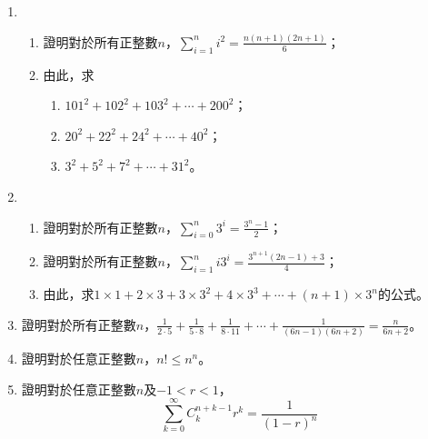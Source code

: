 \documentclass[12pt]{article}
\begin{document}
\begin{enumerate}
        \item \begin{enumerate}
            \item 證明對於所有正整數$n$，$\displaystyle \sum_{i=1}^{n}i^2=\frac{n(n+1)(2n+1)}{6}$；
            \item 由此，求\begin{enumerate}
                \item $101^2+102^2+103^2+\cdots+200^2$；
                \item $20^2+22^2+24^2+\cdots+40^2$；
                \item $3^2+5^2+7^2+\cdots+31^2$。
            \end{enumerate}
        \end{enumerate}
        \item \begin{enumerate}
            \item 證明對於所有正整數$n$，$\displaystyle \sum_{i=0}^{n}3^i=\frac{3^n-1}{2}$；
            \item 證明對於所有正整數$n$，$\displaystyle \sum_{i=1}^{n}i3^i=\frac{3^{n+1}(2n-1)+3}{4}$；
            \item 由此，求$1\times 1+2\times 3+3\times 3^2+4\times 3^3+\cdots +(n+1)\times 3^n$的公式。
        \end{enumerate}
        \item 證明對於所有正整數$n$，$\displaystyle \frac{1}{2\cdot 5}+\frac{1}{5\cdot 8}+\frac{1}{8\cdot 11}+\cdots+\frac{1}{(6n-1)(6n+2)}=\frac{n}{6n+2}$。
        \item 證明對於任意正整數$n$，$n!\leq n^n$。
        \item 證明對於任意正整數$n$及$-1<r<1$，$$\sum_{k=0}^\infty C_k^{n+k-1}r^k=\frac{1}{(1-r)^n}$$
    \end{enumerate}
    
\end{document}
